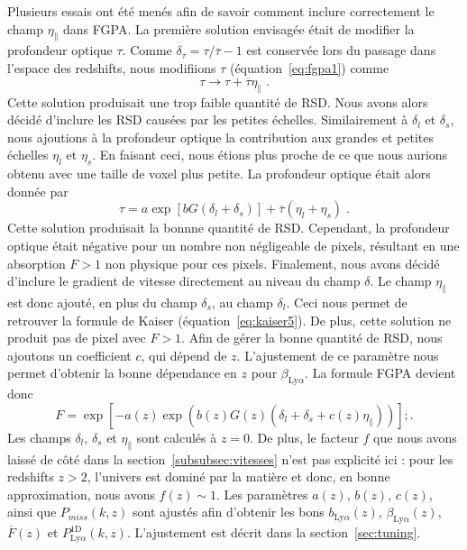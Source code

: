 \documentclass[11pt, twoside, a4paper, openright]{report}
\begin{document}
Plusieurs essais ont été menés afin de savoir comment inclure correctement le champ $\eta_{\parallel}$ dans FGPA.
La première solution envisagée était de modifier la profondeur optique $\tau$. Comme $\delta_{\tau} = \tau / \overline \tau - 1$ est conservée lors du passage dans l'espace des redshifts, nous modifiions $\tau$ (équation~\ref{eq:fgpa1}) comme
\begin{equation}
  \tau \rightarrow \tau + \overline \tau \eta_{\parallel} \; .
\end{equation}
Cette solution produisait une trop faible quantité de RSD. Nous avons alors décidé d'inclure les RSD causées par les petites échelles. Similairement à $\delta_l$ et $\delta_s$, nous ajoutions à la profondeur optique la contribution aux grandes et petites échelles $\eta_l$ et $\eta_s$. En faisant ceci, nous étions plus proche de ce que nous aurions obtenu avec une taille de voxel plus petite.
La profondeur optique était alors donnée par
\begin{equation}
  \tau = a \exp\left[b G (\delta_l + \delta_s)\right] + \overline \tau (\eta_l + \eta_s) \; .
\end{equation}
Cette solution produisait la bonnne quantité de RSD. Cependant, la profondeur optique était négative pour un nombre non négligeable de pixels, résultant en une absorption $F > 1$ non physique pour ces pixels.
Finalement, nous avons décidé d'inclure le gradient de vitesse directement au niveau du champ $\delta$.
Le champ $\eta_{\parallel}$ est donc ajouté, en plus du champ $\delta_s$, au champ $\delta_l$. Ceci nous permet de retrouver la formule de Kaiser (équation~\ref{eq:kaiser5}). De plus, cette solution ne produit pas de pixel avec $F > 1$.
Afin de gérer la bonne quantité de RSD, nous ajoutons un coefficient $c$, qui dépend de $z$. L'ajustement de ce paramètre nous permet d'obtenir la bonne dépendance en $z$ pour $\beta_{\mathrm{Ly}\alpha}$. La formule FGPA devient donc
\begin{equation}
  \label{eq:fgpa4}
  F = \exp\left[ - a(z) \exp(b(z) G(z) (\delta_l + \delta_s + c(z)\eta_{\parallel}))\right] ;.  
\end{equation}
Les champs $\delta_l$, $\delta_s$ et $\eta_{\parallel}$ sont calculés à $z=0$. De plus, le facteur $f$ que nous avons laissé de côté dans la section~\ref{subsubsec:vitesses} n'est pas explicité ici : pour les redshifts $z > 2$, l'univers est dominé par la matière et donc, en bonne approximation, nous avons $f(z) \sim 1$. Les paramètres $a(z)$, $b(z)$, $c(z)$, ainsi que $P_{miss}(k,z)$ sont ajustés afin d'obtenir les bons $b_{\mathrm{Ly}\alpha}(z)$, $\beta_{\mathrm{Ly}\alpha}(z)$, $\overline F(z)$ et $P^{\mathrm{1D}}_{\mathrm{Ly}\alpha}(k,z)$. L'ajustement est décrit dans la section~\ref{sec:tuning}.
\end{document}
